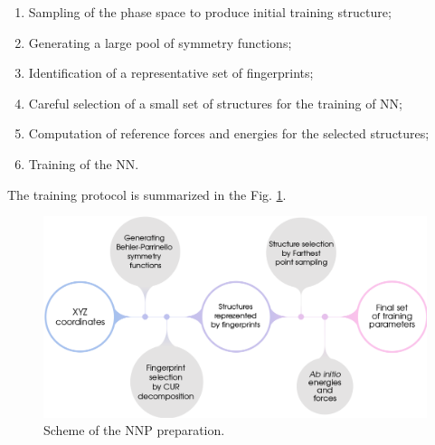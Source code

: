 \documentclass[12pt]{article}
\begin{document}
\begin{enumerate}
    \item Sampling of the phase space to produce initial training structure;
    \item Generating a large pool of symmetry functions;
    \item Identification of a representative set of fingerprints;
    \item Careful selection of a small set of structures for the training of NN;
    \item Computation of reference forces and energies for the selected structures;
    \item Training of the NN.
\end{enumerate}

The training protocol is summarized in the Fig. \ref{protocol}.
\begin{figure} [!htp]
    \centering
    \includegraphics[scale=1.5]{latex_files/protocol.png}
    \caption{Scheme of the NNP preparation.}
    \label{protocol}
\end{figure}

\newpage
\end{document}
